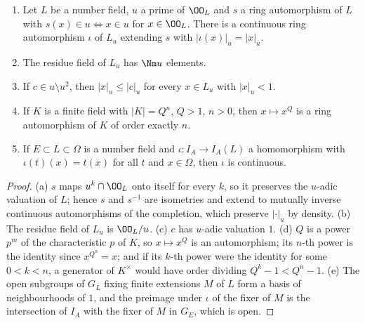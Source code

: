 \begin{lemma}\label{pf:llc:junkaux}
\begin{enumerate}[label=(\alph*)]
\item Let $L$ be a number field, $u$ a prime of $\OO_L$ and $s$ a ring automorphism of $L$ with $s(x)\in u\iff x\in u$ for
  $x\in\OO_L$. There is a continuous ring automorphism $\iota$ of $L_u$ extending $s$ with $|\iota(x)|_u=|x|_u$.
\item The residue field of $L_u$ has $\Nm u$ elements.
\item If $c\in u\setminus u^2$, then $|x|_u\le|c|_u$ for every $x\in L_u$ with $|x|_u<1$.
\item If $K$ is a finite field with $|K|=Q^n$, $Q>1$, $n>0$, then $x\mapsto x^Q$ is a ring automorphism of $K$ of order
  exactly $n$.
\item If $E\subset L\subset\Omega$ is a number field and $\iota\colon I_A\to I_A(L)$ a homomorphism with $\iota(t)(x)=t(x)$
  for all $t$ and $x\in\Omega$, then $\iota$ is continuous.
\end{enumerate}
\end{lemma}

\begin{proof}
(a) $s$ maps $u^k\cap\OO_L$ onto itself for every $k$, so it preserves the $u$-adic valuation of $L$; hence $s$ and $s^{-1}$
are isometries and extend to mutually inverse continuous automorphisms of the completion, which preserve
$|\cdot|_u$ by density. (b) The residue field of $L_u$ is $\OO_L/u$. (c) $c$ has $u$-adic valuation $1$. (d) $Q$ is a
power $p^m$ of the characteristic $p$ of $K$, so $x\mapsto x^Q$ is an automorphism; its $n$-th power is the identity
since $x^{Q^n}=x$; and if its $k$-th power were the identity for some $0<k<n$, a generator of $K^\times$ would have
order dividing $Q^k-1<Q^n-1$. (e) The open subgroups of $G_L$ fixing finite extensions $M$ of $L$ form a basis of
neighbourhoods of $1$, and the preimage under $\iota$ of the fixer of $M$ is the intersection of $I_A$ with the fixer
of $M$ in $G_E$, which is open.
\end{proof}

